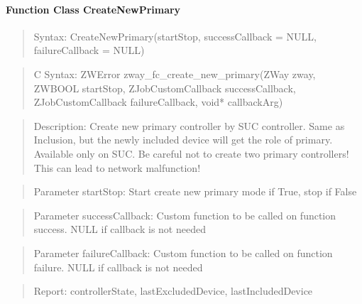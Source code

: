 \paragraph{Function Class CreateNewPrimary}
\begin{quote}Syntax: CreateNewPrimary(startStop, successCallback = NULL, failureCallback = NULL)\end{quote}
\begin{quote}C Syntax: ZWError zway\_fc\_create\_new\_primary(ZWay zway, ZWBOOL startStop, ZJobCustomCallback successCallback, ZJobCustomCallback failureCallback, void* callbackArg)\end{quote}
\begin{quote}Description: Create new primary controller by SUC controller. Same as Inclusion, but the newly included device will get the role of primary. Available only on SUC. Be careful not to create two primary controllers! This can lead to network malfunction!\end{quote}
\begin{quote}Parameter startStop: Start create new primary mode if True, stop if False\end{quote}
\begin{quote}Parameter successCallback: Custom function to be called on function success. NULL if callback is not needed\end{quote}
\begin{quote}Parameter failureCallback: Custom function to be called on function failure. NULL if callback is not needed\end{quote}
\begin{quote}Report: controllerState, lastExcludedDevice, lastIncludedDevice\end{quote}

